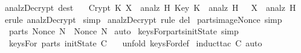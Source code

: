 \begin{isabellebody}
  \isamarkupfalse%
  \endisatagproof
  {\isafoldproof}%
  \isadelimproof
  \isanewline
  \endisadelimproof
  \isanewline
  \isanewline
  \isamarkupfalse%
  \ analz{\isacharunderscore}Decrypt{\isacharprime}\ {\isacharbrackleft}dest{\isacharbrackright}{\isacharcolon}\isanewline
  \ \ {\isachardoublequoteopen}{\isasymlbrakk}\ Crypt\ K\ X\ {\isasymin}\ analz\ H{\isacharsemicolon}\ Key\ K\ {\isasymin}\ analz\ H\ {\isasymrbrakk}\ {\isasymLongrightarrow}\ X\ {\isasymin}\ analz\ H{\isachardoublequoteclose}\isanewline
  \isadelimproof
  \endisadelimproof
  \isatagproof
  \isamarkupfalse%
  \ {\isacharparenleft}erule\ analz{\isachardot}Decrypt{\isacharparenright}\isanewline
  \isamarkupfalse%
  \ {\isacharparenleft}simp{\isacharparenright}\isanewline
  \isamarkupfalse%
  \endisatagproof
  {\isafoldproof}%
  \isadelimproof
  \isanewline
  \endisadelimproof
  \isanewline
  \isanewline
  \isamarkupfalse%
  \ analz{\isachardot}Decrypt\ {\isacharbrackleft}rule\ del{\isacharbrackright}\isanewline
  \isanewline
  \isanewline
  \isamarkupfalse%
  \ parts{\isacharunderscore}image{\isacharunderscore}Nonce\ {\isacharbrackleft}simp{\isacharbrackright}\ {\isacharcolon}\isanewline
  \ \ {\isachardoublequoteopen}parts\ {\isacharparenleft}Nonce{\isacharbackquote}\ N{\isacharparenright}\ {\isacharequal}\ Nonce{\isacharbackquote}\ N{\isachardoublequoteclose}\isanewline
  \isadelimproof
  \endisadelimproof
  \isatagproof
  \isamarkupfalse%
  \ auto%
  \endisatagproof
  {\isafoldproof}%
  \isadelimproof
  \isanewline
  \endisadelimproof
  \isanewline
  \isanewline
  \isamarkupfalse%
  \ keysFor{\isacharunderscore}parts{\isacharunderscore}initState\ {\isacharbrackleft}simp{\isacharbrackright}\ {\isacharcolon}\ \isanewline
  \ \ {\isachardoublequoteopen}keysFor\ {\isacharparenleft}parts\ {\isacharparenleft}initState\ C{\isacharparenright}{\isacharparenright}\ {\isacharequal}\ {\isacharbraceleft}{\isacharbraceright}{\isachardoublequoteclose}\isanewline
  \isadelimproof
  \endisadelimproof
  \isatagproof
  \isamarkupfalse%
  \ {\isacharparenleft}unfold\ keysFor{\isacharunderscore}def{\isacharparenright}\isanewline
  \isamarkupfalse%
  \ {\isacharparenleft}induct{\isacharunderscore}tac\ {\isachardoublequoteopen}C{\isachardoublequoteclose}{\isacharcomma}\ auto{\isacharparenright}\isanewline
  \isamarkupfalse%
  \endisatagproof

\end{isabellebody}
